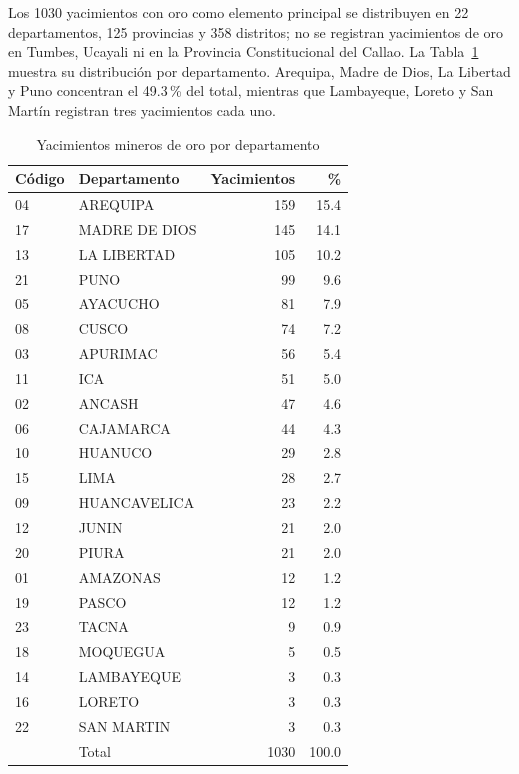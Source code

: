\documentclass[man,12pt,a4paper,floatsintext,donotrepeattitle]{apa7}
\newcommand{\interlineadosencillo}{\renewcommand{\baselinestretch}{1}\selectfont}
\begin{document}
Los 1030 yacimientos con oro como elemento principal se distribuyen en 22
departamentos, 125 provincias y 358 distritos; no se registran yacimientos de oro
en Tumbes, Ucayali ni en la Provincia Constitucional del Callao. La
Tabla~\ref{tab:departamentos} muestra su distribución por departamento. Arequipa,
Madre de Dios, La Libertad y Puno concentran el 49.3\,\% del total, mientras que
Lambayeque, Loreto y San Martín registran tres yacimientos cada uno.

\begin{table}[htbp]
\caption{Yacimientos mineros de oro por departamento}
\label{tab:departamentos}
\centering
\interlineadosencillo
\begin{threeparttable}
\begin{tabular}{@{}llrr@{}}
\toprule
Código & Departamento & Yacimientos & \% \\
\midrule
04 & AREQUIPA       & 159 & 15.4 \\
17 & MADRE DE DIOS  & 145 & 14.1 \\
13 & LA LIBERTAD    & 105 & 10.2 \\
21 & PUNO           &  99 &  9.6 \\
05 & AYACUCHO       &  81 &  7.9 \\
08 & CUSCO          &  74 &  7.2 \\
03 & APURIMAC       &  56 &  5.4 \\
11 & ICA            &  51 &  5.0 \\
02 & ANCASH         &  47 &  4.6 \\
06 & CAJAMARCA      &  44 &  4.3 \\
10 & HUANUCO        &  29 &  2.8 \\
15 & LIMA           &  28 &  2.7 \\
09 & HUANCAVELICA   &  23 &  2.2 \\
12 & JUNIN          &  21 &  2.0 \\
20 & PIURA          &  21 &  2.0 \\
01 & AMAZONAS       &  12 &  1.2 \\
19 & PASCO          &  12 &  1.2 \\
23 & TACNA          &   9 &  0.9 \\
18 & MOQUEGUA       &   5 &  0.5 \\
14 & LAMBAYEQUE     &   3 &  0.3 \\
16 & LORETO         &   3 &  0.3 \\
22 & SAN MARTIN     &   3 &  0.3 \\
\midrule
   & Total          & 1030 & 100.0 \\

\end{tabular}
\end{threeparttable}
\end{table}
\end{document}

